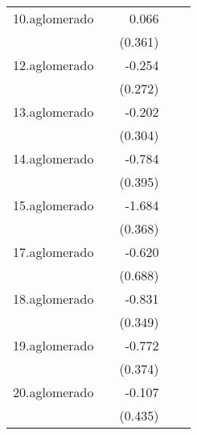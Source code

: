 {\begin{longtable}{l*{4}{D{.}{.}{-1}}}
\addlinespace
10.aglomerado&                     &       0.066         &                     &                     \\
            &                     &     (0.361)         &                     &                     \\
\addlinespace
12.aglomerado&                     &      -0.254         &                     &                     \\
            &                     &     (0.272)         &                     &                     \\
\addlinespace
13.aglomerado&                     &      -0.202         &                     &                     \\
            &                     &     (0.304)         &                     &                     \\
\addlinespace
14.aglomerado&                     &      -0.784\sym{*}  &                     &                     \\
            &                     &     (0.395)         &                     &                     \\
\addlinespace
15.aglomerado&                     &      -1.684\sym{***}&                     &                     \\
            &                     &     (0.368)         &                     &                     \\
\addlinespace
17.aglomerado&                     &      -0.620         &                     &                     \\
            &                     &     (0.688)         &                     &                     \\
\addlinespace
18.aglomerado&                     &      -0.831\sym{*}  &                     &                     \\
            &                     &     (0.349)         &                     &                     \\
\addlinespace
19.aglomerado&                     &      -0.772\sym{*}  &                     &                     \\
            &                     &     (0.374)         &                     &                     \\
\addlinespace
20.aglomerado&                     &      -0.107         &                     &                     \\
            &                     &     (0.435)         &                     &                     \\

\end{longtable}}
